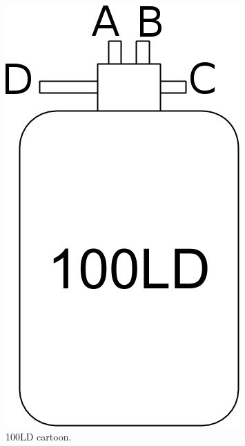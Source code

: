 \begin{figure}[!htbp]
\begin{minipage}{.40\textwidth}
 \includegraphics[width=\textwidth]{./img/100LD-cartoon.jpg}
 \caption{100LD cartoon.}
 \label{fig:100LD-cartoon}
 \end{minipage}
 \quad
\end{figure}

